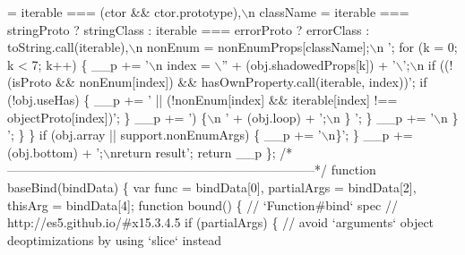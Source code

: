 \begin{DoxyCodeInclude}
{       = iterable === (ctor && ctor.prototype),\(\backslash\)n        className = iterable === stringProto ? stringClass :
       iterable === errorProto ? errorClass : toString.call(iterable),\(\backslash\)n        nonEnum = nonEnumProps[className];\(\backslash\)n    
        '};
       \textcolor{keywordflow}{for} (k = 0; k < 7; k++) \{
      \_\_p += \textcolor{stringliteral}{'\(\backslash\)n    index = \(\backslash\)''} +
      (obj.shadowedProps[k]) +
      \textcolor{charliteral}{'\(\backslash\)'};\(\backslash\)n    \textcolor{keywordflow}{if} ((!(isProto && nonEnum[index]) && hasOwnProperty.call(iterable, index))\textcolor{stringliteral}{';}
\textcolor{stringliteral}{              if (!obj.useHas) \{}
\textcolor{stringliteral}{      \_\_p += '} || (!nonEnum[index] && iterable[index] !== objectProto[index])\textcolor{stringliteral}{';}
\textcolor{stringliteral}{       \}}
\textcolor{stringliteral}{      \_\_p += '}) \{\(\backslash\)n      \textcolor{stringliteral}{' +}
\textcolor{stringliteral}{      (obj.loop) +}
\textcolor{stringliteral}{      '};\(\backslash\)n    \}      \textcolor{stringliteral}{';}
\textcolor{stringliteral}{       \}}
\textcolor{stringliteral}{      \_\_p += '}\(\backslash\)n  \}    \textcolor{stringliteral}{';}
\textcolor{stringliteral}{       \}}
\textcolor{stringliteral}{}
\textcolor{stringliteral}{       \}}
\textcolor{stringliteral}{}
\textcolor{stringliteral}{       if (obj.array || support.nonEnumArgs) \{}
\textcolor{stringliteral}{      \_\_p += '}\(\backslash\)n\}\textcolor{stringliteral}{';}
\textcolor{stringliteral}{       \}}
\textcolor{stringliteral}{      \_\_p +=}
\textcolor{stringliteral}{      (obj.bottom) +}
\textcolor{stringliteral}{      '};\(\backslash\)nreturn result\textcolor{stringliteral}{';}
\textcolor{stringliteral}{}
\textcolor{stringliteral}{      return \_\_p}
\textcolor{stringliteral}{    \};}
\textcolor{stringliteral}{}
\textcolor{stringliteral}{    /*--------------------------------------------------------------------------*/}
\textcolor{stringliteral}{}
\textcolor{stringliteral}{    function baseBind(bindData) \{}
\textcolor{stringliteral}{      var func = bindData[0],}
\textcolor{stringliteral}{          partialArgs = bindData[2],}
\textcolor{stringliteral}{          thisArg = bindData[4];}
\textcolor{stringliteral}{}
\textcolor{stringliteral}{      function bound() \{}
\textcolor{stringliteral}{        // `Function#bind` spec}
\textcolor{stringliteral}{        // http://es5.github.io/#x15.3.4.5}
\textcolor{stringliteral}{        if (partialArgs) \{}
\textcolor{stringliteral}{          // avoid `arguments` object deoptimizations by using `slice` instead}

\end{DoxyCodeInclude}
